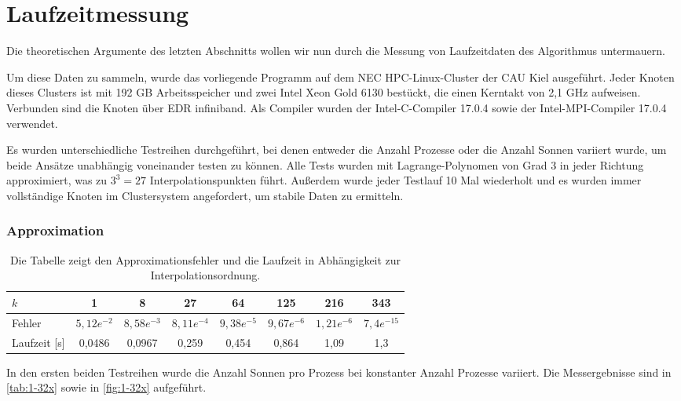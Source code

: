   \section{Laufzeitmessung}
  \label{sec:lauf}
  Die theoretischen Argumente des letzten Abschnitts wollen wir nun durch die Messung von Laufzeitdaten des Algorithmus untermauern.
  
  Um diese Daten zu sammeln, wurde das vorliegende Programm auf dem NEC HPC-Linux-Cluster der CAU Kiel ausgeführt. Jeder Knoten dieses Clusters ist mit 192 GB Arbeitsspeicher und zwei Intel Xeon Gold 
  6130 bestückt, die einen Kerntakt von 2,1 GHz aufweisen. Verbunden sind die Knoten über EDR infiniband. Als Compiler wurden der Intel-C-Compiler 17.0.4 sowie der Intel-MPI-Compiler 17.0.4 verwendet.
  
  Es wurden unterschiedliche Testreihen durchgeführt, bei denen entweder die Anzahl Prozesse oder die Anzahl Sonnen variiert wurde, um beide Ansätze unabhängig voneinander testen zu können.
  Alle Tests wurden mit Lagrange-Polynomen von Grad $3$ in jeder Richtung approximiert, was zu $3^3 = 27$ Interpolationspunkten führt. Außerdem wurde jeder Testlauf 10 Mal wiederholt und es wurden immer 
  vollständige Knoten im Clustersystem angefordert, um stabile Daten zu ermitteln.
  
  \subsubsection{Approximation}
  
  
  \begin{table}[b]
    \begin{tabular}{|l|c c c c c c c|}
    \hline
    $k$ & 1 & 8 & 27 & 64 & 125 & 216 & 343\\
    \hline
    Fehler & $5,12e^{-2}$ & $8,58e^{-3}$ & $8,11e^{-4}$ & $9,38e^{-5}$ & $9,67e^{-6}$ & $1,21e^{-6}$ & $7,4e^{-15}$\\
    \hline
    Laufzeit [s] & 0,0486 & 0,0967 & 0,259 & 0,454 & 0,864 & 1,09 & 1,3\\
    \hline
    \end{tabular}
    \caption{Die Tabelle zeigt den Approximationsfehler und die Laufzeit in Abhängigkeit zur Interpolationsordnung.}
    \label{tab:error}
  \end{table}
  
  In den ersten beiden Testreihen wurde die Anzahl Sonnen pro Prozess bei konstanter Anzahl Prozesse variiert. Die Messergebnisse sind in \autoref{tab:1-32x} sowie in \autoref{fig:1-32x} 
  aufgeführt.
  
